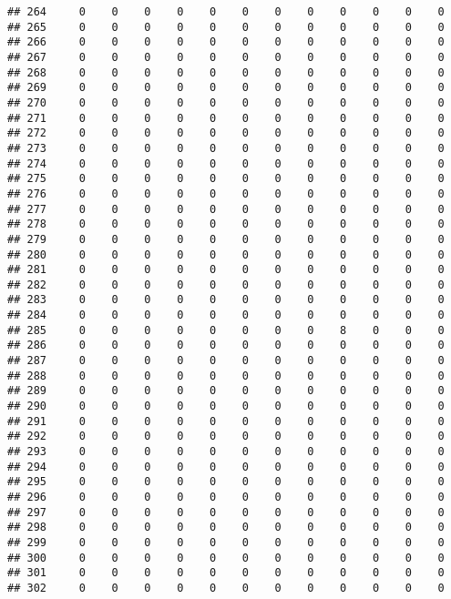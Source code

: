 \documentclass[]{article}
\begin{document}
\begin{verbatim}
## 264     0    0    0    0    0    0    0    0    0    0    0    0
## 265     0    0    0    0    0    0    0    0    0    0    0    0
## 266     0    0    0    0    0    0    0    0    0    0    0    0
## 267     0    0    0    0    0    0    0    0    0    0    0    0
## 268     0    0    0    0    0    0    0    0    0    0    0    0
## 269     0    0    0    0    0    0    0    0    0    0    0    0
## 270     0    0    0    0    0    0    0    0    0    0    0    0
## 271     0    0    0    0    0    0    0    0    0    0    0    0
## 272     0    0    0    0    0    0    0    0    0    0    0    0
## 273     0    0    0    0    0    0    0    0    0    0    0    0
## 274     0    0    0    0    0    0    0    0    0    0    0    0
## 275     0    0    0    0    0    0    0    0    0    0    0    0
## 276     0    0    0    0    0    0    0    0    0    0    0    0
## 277     0    0    0    0    0    0    0    0    0    0    0    0
## 278     0    0    0    0    0    0    0    0    0    0    0    0
## 279     0    0    0    0    0    0    0    0    0    0    0    0
## 280     0    0    0    0    0    0    0    0    0    0    0    0
## 281     0    0    0    0    0    0    0    0    0    0    0    0
## 282     0    0    0    0    0    0    0    0    0    0    0    0
## 283     0    0    0    0    0    0    0    0    0    0    0    0
## 284     0    0    0    0    0    0    0    0    0    0    0    0
## 285     0    0    0    0    0    0    0    0    8    0    0    0
## 286     0    0    0    0    0    0    0    0    0    0    0    0
## 287     0    0    0    0    0    0    0    0    0    0    0    0
## 288     0    0    0    0    0    0    0    0    0    0    0    0
## 289     0    0    0    0    0    0    0    0    0    0    0    0
## 290     0    0    0    0    0    0    0    0    0    0    0    0
## 291     0    0    0    0    0    0    0    0    0    0    0    0
## 292     0    0    0    0    0    0    0    0    0    0    0    0
## 293     0    0    0    0    0    0    0    0    0    0    0    0
## 294     0    0    0    0    0    0    0    0    0    0    0    0
## 295     0    0    0    0    0    0    0    0    0    0    0    0
## 296     0    0    0    0    0    0    0    0    0    0    0    0
## 297     0    0    0    0    0    0    0    0    0    0    0    0
## 298     0    0    0    0    0    0    0    0    0    0    0    0
## 299     0    0    0    0    0    0    0    0    0    0    0    0
## 300     0    0    0    0    0    0    0    0    0    0    0    0
## 301     0    0    0    0    0    0    0    0    0    0    0    0
## 302     0    0    0    0    0    0    0    0    0    0    0    0

\end{verbatim}
\end{document}
